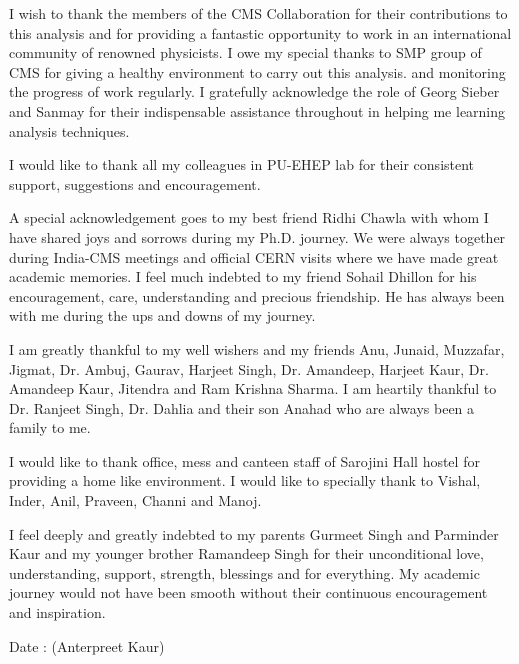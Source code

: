 {I wish to thank the members of the CMS Collaboration for their contributions to this analysis and for providing a fantastic opportunity to work in an international community of renowned physicists. I owe my special thanks to SMP group of CMS for giving a healthy environment to carry out this analysis. and monitoring the progress of work regularly. I gratefully acknowledge the role of Georg Sieber and Sanmay for their indispensable assistance throughout in helping me learning analysis techniques.

I would like to thank all my colleagues in PU-EHEP lab for their consistent support, suggestions and encouragement.

A special acknowledgement goes to my best friend Ridhi Chawla with whom I have shared joys and sorrows during my Ph.D. journey. We were always together during India-CMS meetings and official CERN visits where we have made great academic memories. I feel much indebted to my friend Sohail Dhillon for his encouragement, care, understanding and precious friendship. He has always been with me during the ups and downs of my journey. 

I am greatly thankful to my well wishers and my friends Anu, Junaid, Muzzafar, Jigmat, Dr. Ambuj, Gaurav, Harjeet Singh, Dr. Amandeep, Harjeet Kaur, Dr. Amandeep Kaur, Jitendra and Ram Krishna Sharma. I am heartily thankful to Dr. Ranjeet Singh, Dr. Dahlia and their son Anahad who are always been a family to me. 

I would like to thank office, mess and canteen staff of Sarojini Hall hostel for providing a home like environment. I would like to specially thank to Vishal, Inder, Anil, Praveen, Channi and Manoj.

I feel deeply and greatly indebted to my parents Gurmeet Singh and Parminder Kaur and my younger brother Ramandeep Singh for their unconditional love, understanding, support, strength, blessings and for everything. My academic journey would not have been smooth without their continuous encouragement and inspiration.\\[2cm]}
Date :  \hfill (Anterpreet Kaur)
